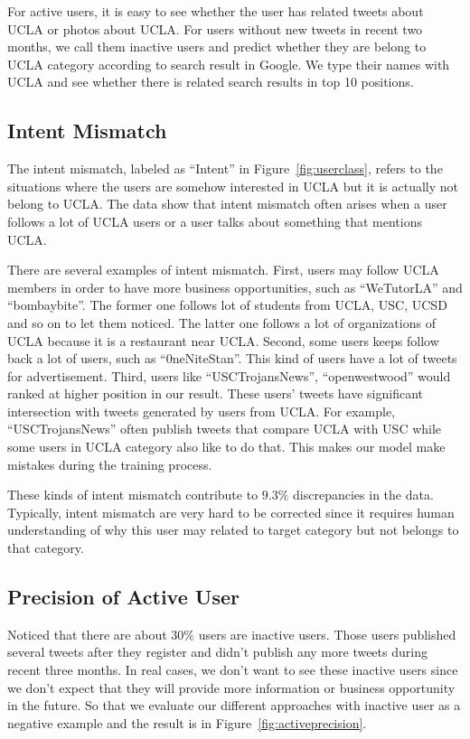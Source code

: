 \documentclass{article}
\begin{document}
For active users, it is easy to see whether the user has related tweets about UCLA or photos about UCLA. For users without new tweets in recent two months, we call them inactive users and predict whether they are belong to UCLA category according to search result in Google. We type their names with UCLA and see whether there is related search results in top 10 positions.

\subsection{Intent Mismatch}
The intent mismatch, labeled as ``Intent'' in Figure~\ref{fig:userclass}, refers to the situations where the users are somehow interested in UCLA but it is actually not belong to UCLA. The data show that intent mismatch often arises when a user follows a lot of UCLA users or a user talks about something that mentions UCLA.

There are several examples of intent mismatch. First, users may follow UCLA members in order to have more business opportunities, such as ``WeTutorLA'' and ``bombaybite''. The former one follows lot of students from UCLA, USC, UCSD and so on to let them noticed. The latter one follows a lot of organizations of UCLA because it is a restaurant near UCLA. Second, some users keeps follow back a lot of users, such as ``0neNiteStan''. This kind of users have a lot of tweets for advertisement. Third, users like ``USCTrojansNews'', ``openwestwood'' would ranked at higher position in our result. These users' tweets have significant intersection with tweets generated by users from UCLA. For example, ``USCTrojansNews'' often publish tweets that compare UCLA with USC while some users in UCLA category also like to do that. This makes our model make mistakes during the training process.

These kinds of intent mismatch contribute to $9.3\%$ discrepancies in the data. Typically, intent mismatch are very hard to be corrected since it requires human understanding of why this user may related to target category but not belongs to that category.

\subsection{Precision of Active User}

Noticed that there are about $30\%$ users are inactive users. Those users published several tweets after they register and didn't publish any more tweets during recent three months. In real cases, we don't want to see these inactive users since we don't expect that they will provide more information or business opportunity in the future. So that we evaluate our different approaches with inactive user as a negative example and the result is in Figure~\ref{fig:activeprecision}.
\end{document}
